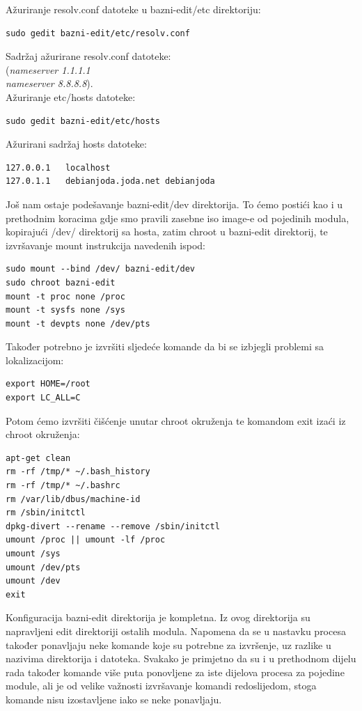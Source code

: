 \documentclass[12pt,vi]{mitthesis}
\begin{document}
Ažuriranje resolv.conf datoteke u bazni-edit/etc direktoriju:
\begin{lstlisting}[style=BashInputStyle]
sudo gedit bazni-edit/etc/resolv.conf
\end{lstlisting}
\noindent
Sadržaj ažurirane resolv.conf\cite{wiki-resolv.conf} datoteke:\\
(\textit{nameserver 1.1.1.1 \\
nameserver 8.8.8.8}).\\
\noindent
Ažuriranje etc/hosts\cite{wiki-hosts-file} datoteke:
\begin{lstlisting}[style=BashInputStyle]
sudo gedit bazni-edit/etc/hosts
\end{lstlisting}
Ažurirani sadržaj hosts datoteke:
\begin{lstlisting}
127.0.0.1	localhost
127.0.1.1	debianjoda.joda.net	debianjoda
\end{lstlisting}

\noindent
Još nam ostaje podešavanje bazni-edit/dev direktorija. To ćemo postići kao i u prethodnim koracima gdje smo pravili zasebne iso image-e od pojedinih modula, kopirajući /dev/ direktorij sa hosta, zatim chroot u bazni-edit direktorij, te izvršavanje mount instrukcija navedenih ispod:
\begin{lstlisting}[style=BashInputStyle]
sudo mount --bind /dev/ bazni-edit/dev
sudo chroot bazni-edit
mount -t proc none /proc
mount -t sysfs none /sys
mount -t devpts none /dev/pts
\end{lstlisting}

\noindent
Također potrebno je izvršiti sljedeće komande da bi se izbjegli problemi sa lokalizacijom:
\begin{lstlisting}[style=BashInputStyle]
export HOME=/root
export LC_ALL=C
\end{lstlisting}

Potom ćemo izvršiti čišćenje unutar chroot okruženja te komandom exit izaći iz chroot okruženja:
\begin{lstlisting}[style=BashInputStyle]
apt-get clean
rm -rf /tmp/* ~/.bash_history
rm -rf /tmp/* ~/.bashrc
rm /var/lib/dbus/machine-id
rm /sbin/initctl
dpkg-divert --rename --remove /sbin/initctl
umount /proc || umount -lf /proc
umount /sys
umount /dev/pts
umount /dev
exit
\end{lstlisting}
\indent
Konfiguracija bazni-edit direktorija je kompletna. Iz ovog direktorija su napravljeni edit direktoriji ostalih modula. Napomena da se u nastavku procesa također ponavljaju neke komande koje su potrebne za izvršenje, uz razlike u nazivima direktorija i datoteka. Svakako je primjetno da su i u prethodnom dijelu rada također komande više puta ponovljene za iste dijelova procesa za pojedine module, ali je od velike važnosti izvršavanje komandi redoslijedom, stoga komande nisu izostavljene iako se neke ponavljaju.
\end{document}
